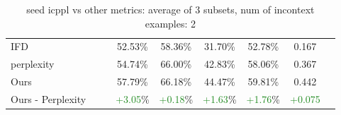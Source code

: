 \begin{table}[t!]
{\begin{tabular}{l|l|c|c|c|c|c|c|c}
    IFD  &   &   & 52.53\% & 58.36\% & 31.70\% & 52.78\% & 0.167 \\
    perplexity  &   &   & 54.74\% & 66.00\% & 42.83\% & 58.06\% & 0.367 \\
    Ours  &   &   & 57.79\% & 66.18\% & 44.47\% & 59.81\% & 0.442 \\
    \hline
    Ours - Perplexity  &   &   & \textcolor{ForestGreen}{+3.05}\% & \textcolor{ForestGreen}{+0.18}\% & \textcolor{ForestGreen}{+1.63}\% & \textcolor{ForestGreen}{+1.76}\% & \textcolor{ForestGreen}{+0.075} \\
    \hline
  \end{tabular}}
  \caption{seed icppl vs other metrics: average of 3 subsets, num of incontext examples: 2}
  \label{tab:icppl vs other metrics: average of 3 subsets, num of incontext examples: 2}
\end{table}



